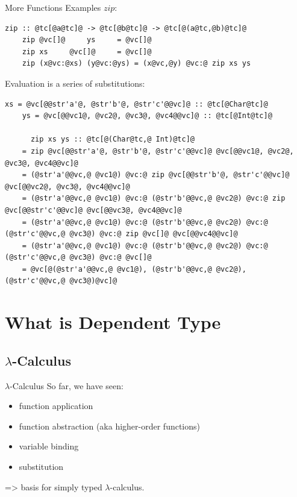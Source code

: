 \documentclass[xcolor={usenames,dvipsnames}]{beamer}
\begin{document}
\begin{frame}[fragile]{More Functions Examples}
  $zip$:
  \begin{lstlisting}[style=hask]
    zip :: @tc[@a@tc]@ -> @tc[@b@tc]@ -> @tc[@(a@tc,@b)@tc]@
    zip @vc[]@     ys     = @vc[]@
    zip xs     @vc[]@     = @vc[]@
    zip (x@vc:@xs) (y@vc:@ys) = (x@vc,@y) @vc:@ zip xs ys
  \end{lstlisting}

  Evaluation is a series of substitutions:
  \begin{lstlisting}[style=hask]
    xs = @vc[@@str'a'@, @str'b'@, @str'c'@@vc]@ :: @tc[@Char@tc]@
    ys = @vc[@@vc1@, @vc2@, @vc3@, @vc4@@vc]@ :: @tc[@Int@tc]@

      zip xs ys :: @tc[@(Char@tc,@ Int)@tc]@
    = zip @vc[@@str'a'@, @str'b'@, @str'c'@@vc]@ @vc[@@vc1@, @vc2@, @vc3@, @vc4@@vc]@
    = (@str'a'@@vc,@ @vc1@) @vc:@ zip @vc[@@str'b'@, @str'c'@@vc]@ @vc[@@vc2@, @vc3@, @vc4@@vc]@
    = (@str'a'@@vc,@ @vc1@) @vc:@ (@str'b'@@vc,@ @vc2@) @vc:@ zip @vc[@@str'c'@@vc]@ @vc[@@vc3@, @vc4@@vc]@
    = (@str'a'@@vc,@ @vc1@) @vc:@ (@str'b'@@vc,@ @vc2@) @vc:@ (@str'c'@@vc,@ @vc3@) @vc:@ zip @vc[]@ @vc[@@vc4@@vc]@
    = (@str'a'@@vc,@ @vc1@) @vc:@ (@str'b'@@vc,@ @vc2@) @vc:@ (@str'c'@@vc,@ @vc3@) @vc:@ @vc[]@
    = @vc[@(@str'a'@@vc,@ @vc1@), (@str'b'@@vc,@ @vc2@), (@str'c'@@vc,@ @vc3@)@vc]@
  \end{lstlisting}
\end{frame}


\section{What is Dependent Type}

\subsection{$\lambda$-Calculus}

\begin{frame}[fragile]{$\lambda$-Calculus}
  So far, we have seen:
  \pause
  \begin{itemize}
    \item function application
    \pause
    \item function abstraction {\tiny(aka higher-order functions)}
    \pause
    \item variable binding
    \pause
    \item substitution
  \end{itemize}
  \pause
  => basis for simply typed $\lambda$-calculus.
\end{frame}
\end{document}
